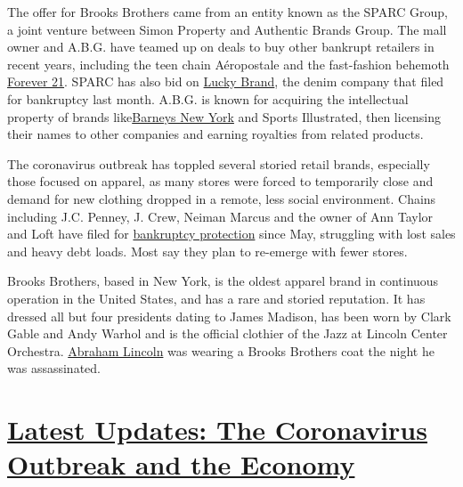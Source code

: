 The offer for Brooks Brothers came from an entity known as the SPARC
Group, a joint venture between Simon Property and Authentic Brands
Group. The mall owner and A.B.G. have teamed up on deals to buy other
bankrupt retailers in recent years, including the teen chain Aéropostale
and the fast-fashion behemoth
\href{https://www.nytimes3xbfgragh.onion/2019/10/23/business/forever-21-bankruptcy-chang-family.html?searchResultPosition=8}{Forever
21}. SPARC has also bid on
\href{https://www.wsj.com/articles/clothing-retailer-lucky-brand-files-for-bankruptcy-11593821941}{Lucky
Brand}, the denim company that filed for bankruptcy last month. A.B.G.
is known for acquiring the intellectual property of brands
like\href{https://www.nytimes3xbfgragh.onion/2019/10/24/business/barneys-banktrupcy-bidder.html}{Barneys
New York} and Sports Illustrated, then licensing their names to other
companies and earning royalties from related products.

The coronavirus outbreak has toppled several storied retail brands,
especially those focused on apparel, as many stores were forced to
temporarily close and demand for new clothing dropped in a remote, less
social environment. Chains including J.C. Penney, J. Crew, Neiman Marcus
and the owner of Ann Taylor and Loft have filed for
\href{https://www.nytimes3xbfgragh.onion/2020/07/23/business/ascena-bankruptcy-ann-taylor-lane-bryant.html}{bankruptcy
protection} since May, struggling with lost sales and heavy debt loads.
Most say they plan to re-emerge with fewer stores.

Brooks Brothers, based in New York, is the oldest apparel brand in
continuous operation in the United States, and has a rare and storied
reputation. It has dressed all but four presidents dating to James
Madison, has been worn by Clark Gable and Andy Warhol and is the
official clothier of the Jazz at Lincoln Center Orchestra.
\href{https://magazine.brooksbrothers.com/dressing-lincoln/}{Abraham
Lincoln} was wearing a Brooks Brothers coat the night he was
assassinated.

\hypertarget{latest-updates-the-coronavirus-outbreak-and-the-economy}{%
\section{\texorpdfstring{\href{https://www.nytimes3xbfgragh.onion/live/2020/09/08/business/stock-market-today-coronavirus?action=click\&pgtype=Article\&state=default\&region=MAIN_CONTENT_1\&context=storylines_live_updates}{Latest
Updates: The Coronavirus Outbreak and the
Economy}}{Latest Updates: The Coronavirus Outbreak and the Economy}}\label{latest-updates-the-coronavirus-outbreak-and-the-economy}}

